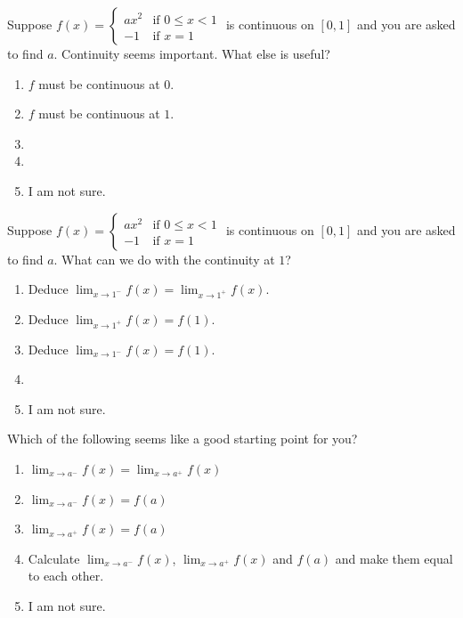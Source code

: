 \documentclass[aspectratio=169, 14pt, t]{beamer}  %
\begin{document}
\begin{poll}
  Suppose \(f(x) = \begin{cases} ax^{2} &\text{if } 0 \le x < 1 \\ -1 &\text{if } x = 1 \end{cases}\) is continuous on \([0,1]\) and you are asked to find \(a\). Continuity seems important. What else is useful?

  \begin{enumerate}
    \item \(f\) must be continuous at \(0\).
    \item \(f\) must be continuous at \(1\).
    \item
    \item
    \item I am not sure.
  \end{enumerate}
\end{poll}

\begin{poll}
  Suppose \(f(x) = \begin{cases} ax^{2} &\text{if } 0 \le x < 1 \\ -1 &\text{if } x = 1 \end{cases}\) is continuous on \([0,1]\) and you are asked to find \(a\). What can we do with the continuity at \(1\)?

  \begin{enumerate}
    \item Deduce \(\lim_{x \to 1^{-}} f(x) = \lim_{x \to 1^{+}} f(x)\).
    \item Deduce \(\lim_{x \to 1^{+}} f(x) = f(1)\).
    \item Deduce \(\lim_{x \to 1^{-}} f(x) = f(1)\).
    \item
    \item I am not sure.
  \end{enumerate}
\end{poll}

\begin{poll}
  Which of the following seems like a good starting point for you?

  \begin{enumerate}
    \item \(\lim_{x \to a^{-}} f(x) = \lim_{x \to a^{+}} f(x)\)
    \item \(\lim_{x \to a^{-}} f(x) = f(a)\)
    \item \(\lim_{x \to a^{+}} f(x) = f(a)\)
    \item Calculate \(\lim_{x \to a^{-}} f(x)\), \(\lim_{x \to a^{+}} f(x)\) and \(f(a)\) and make them equal to each other.
    \item I am not sure.
  \end{enumerate}
\end{poll}
\end{document}
